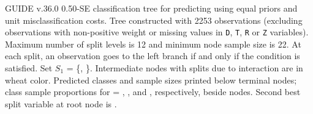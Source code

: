 \documentclass[12pt]{article}
\begin{document}
GUIDE v.36.0 0.50-SE
classification tree for predicting \texttt{} using
equal priors
and unit misclassification costs.
 Tree constructed with 2253 observations
 (excluding observations with non-positive weight or missing values
 in \texttt{D}, \texttt{T}, \texttt{R} or \texttt{Z} variables).
 Maximum number of split levels is 12 and minimum node sample size is 22.
At each split, an observation goes to the left branch 
 if and only if the condition is satisfied.
 Set $S_{1}$ = \{\texttt{}, \texttt{}\}.
 Intermediate nodes with splits due to interaction are in wheat color.
Predicted classes and sample sizes printed below terminal nodes;
class sample proportions for \texttt{} =
 \texttt{}, \texttt{}, and \texttt{}, respectively, beside nodes.
Second best split variable at root node is \texttt{}.
 
\end{document}
